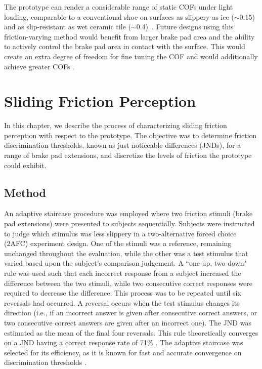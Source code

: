 \documentclass [12pt,letterpaper]{report}
\begin{document}
The prototype can render a considerable range of static COFs under light loading, comparable to a conventional shoe on surfaces as slippery as ice ($\sim$0.15)~\cite{manning2001effect} and as slip-resistant as wet ceramic tile ($\sim$0.4)~\cite{liu2010friction}. Future designs using this friction-varying method would benefit from larger brake pad area and the ability to actively control the brake pad area in contact with the surface. This would create an extra degree of freedom for fine tuning the COF and would additionally achieve greater COFs \cite{millet2016design}.


\chapter{Sliding Friction Perception}
\label{perception}

In this chapter, we describe the process of characterizing sliding friction perception with respect to the prototype. The objective was to determine friction discrimination thresholds, known as just noticeable differences (JNDs), for a range of brake pad extensions, and discretize the levels of friction the prototype could exhibit.

\section{Method}

An adaptive staircase procedure was employed where two friction stimuli (brake pad extensions) were presented to subjects sequentially. Subjects were instructed to judge which stimulus was less slippery in a two-alternative forced choice (2AFC) experiment design. One of the stimuli was a reference, remaining unchanged throughout the evaluation, while the other was a test stimulus that varied based upon the subject's comparison judgement. A ``one-up, two-down" rule was used such that each incorrect response from a subject increased the difference between the two stimuli, while two consecutive correct responses were required to decrease the difference. This process was to be repeated until six reversals had occurred. A reversal occurs when the test stimulus changes its direction (i.e., if an incorrect answer is given after consecutive correct answers, or two consecutive correct answers are given after an incorrect one). The JND was estimated as the mean of the final four reversals. This rule theoretically converges on a JND having a correct response rate of 71\% \cite{levitt1971transformed}. The adaptive staircase was selected for its efficiency, as it is known for fast and accurate convergence on discrimination thresholds \cite{cornsweet1962staircase,levitt1971transformed,bau2010teslatouch}.
\end{document}
